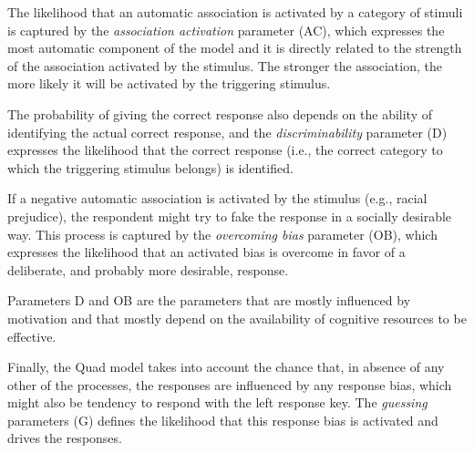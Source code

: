 \documentclass[12pt]{book}
\begin{document}
The likelihood that an automatic association is activated by a category of stimuli is captured by the \emph{association activation} parameter (AC), which expresses the most automatic component of the model and it is directly related to the strength of the association activated by the stimulus. The stronger the association, the more likely it will be activated by the triggering stimulus. 

The probability of giving the correct response also depends on the ability of identifying the actual correct response, and the \emph{discriminability} parameter (D) expresses the likelihood that the correct response (i.e., the correct category to which the triggering stimulus belongs) is identified.

If a negative automatic association is activated by the stimulus (e.g., racial prejudice), the respondent might try to fake the response in a socially desirable way. This process is captured by the \emph{overcoming bias} parameter (OB), which expresses the likelihood that an activated bias is overcome in favor of a deliberate, and probably more desirable, response. 

Parameters D and OB are the parameters that are mostly influenced by motivation and that mostly depend on the availability of cognitive resources to be effective. 

Finally, the Quad model takes into account the chance that, in absence of any other of the processes, the responses are influenced by any response bias, which might also be tendency to respond with the left response key. The \emph{guessing} parameters (G) defines the likelihood that this response bias is activated and drives the responses. 

\end{document}
